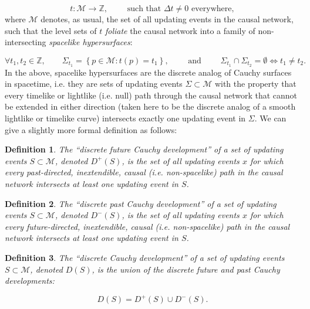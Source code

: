 \documentclass{article}
\newtheorem{definition}{Definition}
\begin{document}
\begin{equation}
t : \mathcal{M} \to \mathbb{Z}, \qquad \text{ such that } \Delta t \neq 0 \text{ everywhere},
\end{equation}
where ${\mathcal{M}}$ denotes, as usual, the set of all updating events in the causal network, such that the level sets of $t$ \textit{foliate} the causal network into a family of non-intersecting \textit{spacelike hypersurfaces}:

\begin{equation}
\forall t_1, t_2 \in \mathbb{Z}, \qquad \Sigma_{t_1} = \left\lbrace p \in \mathcal{M} : t \left( p \right) = t_1 \right\rbrace, \qquad \text{ and } \qquad \Sigma_{t_1} \cap \Sigma_{t_2} = \emptyset \iff t_1 \neq t_2.
\end{equation}
In the above, spacelike hypersurfaces are the discrete analog of Cauchy surfaces in spacetime, i.e. they are sets of updating events ${\Sigma \subset \mathcal{M}}$ with the property that every timelike or lightlike (i.e. null) path through the causal network that cannot be extended in either direction (taken here to be the discrete analog of a smooth lightlike or timelike curve) intersects exactly one updating event in ${\Sigma}$. We can give a slightly more formal definition as follows:

\begin{definition}
The ``discrete future Cauchy development'' of a set of updating events ${S \subset \mathcal{M}}$, denoted ${D^{+} \left( S \right)}$, is the set of all updating events $x$ for which every past-directed, inextendible, causal (i.e. non-spacelike) path in the causal network intersects at least one updating event in $S$.
\end{definition}

\begin{definition}
The ``discrete past Cauchy development'' of a set of updating events ${S \subset \mathcal{M}}$, denoted ${D^{-} \left( S \right)}$, is the set of all updating events $x$ for which every future-directed, inextendible, causal (i.e. non-spacelike) path in the causal network intersects at least one updating event in $S$.
\end{definition}

\begin{definition}
The ``discrete Cauchy development'' of a set of updating events ${S \subset \mathcal{M}}$, denoted ${D \left( S \right)}$, is the union of the discrete future and past Cauchy developments:

\begin{equation}
D \left( S \right) = D^{+} \left( S \right) \cup D^{-} \left( S \right).
\end{equation}
\end{definition}
\end{document}
